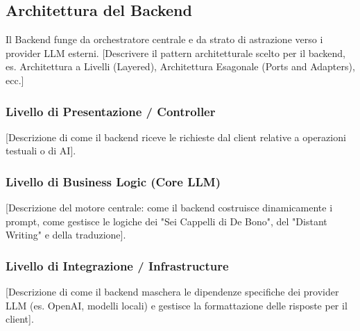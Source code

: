 \subsection{Architettura del Backend}
Il Backend funge da orchestratore centrale e da strato di astrazione verso i provider LLM esterni.
[Descrivere il pattern architetturale scelto per il backend, es. Architettura a Livelli (Layered), Architettura Esagonale (Ports and Adapters), ecc.]

\subsubsection{Livello di Presentazione / Controller}
[Descrizione di come il backend riceve le richieste dal client relative a operazioni testuali o di AI].

\subsubsection{Livello di Business Logic (Core LLM)}
[Descrizione del motore centrale: come il backend costruisce dinamicamente i prompt, come gestisce le logiche dei "Sei Cappelli di De Bono", del "Distant Writing" e della traduzione].

\subsubsection{Livello di Integrazione / Infrastructure}
[Descrizione di come il backend maschera le dipendenze specifiche dei provider LLM (es. OpenAI, modelli locali) e gestisce la formattazione delle risposte per il client].